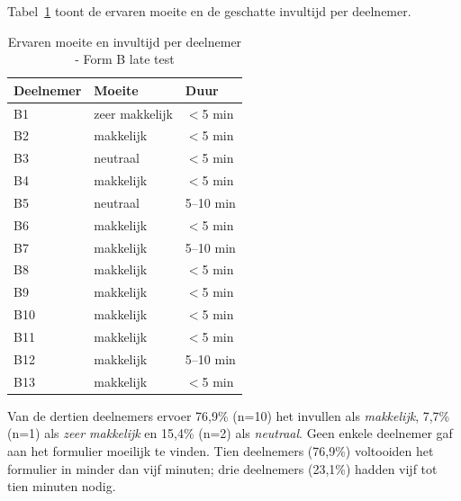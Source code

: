 \subsubsection{}

Tabel~\ref{tab:laat-formb-moeite} toont de ervaren moeite en de geschatte invultijd per deelnemer.

\begin{table}[h]
  \centering
  \caption[Ervaren moeite en invultijd late test Form B]{Ervaren moeite en invultijd per deelnemer - Form B late test}
  \label{tab:laat-formb-moeite}
  \begin{tabular}{lll}
    \hline
    \textbf{Deelnemer} & \textbf{Moeite} & \textbf{Duur} \\
    \hline
    B1  & zeer makkelijk & $<$5 min  \\
    B2  & makkelijk      & $<$5 min  \\
    B3  & neutraal       & $<$5 min  \\
    B4  & makkelijk      & $<$5 min  \\
    B5  & neutraal       & 5–10 min  \\
    B6  & makkelijk      & $<$5 min  \\
    B7  & makkelijk      & 5–10 min  \\
    B8  & makkelijk      & $<$5 min  \\
    B9  & makkelijk      & $<$5 min  \\
    B10 & makkelijk      & $<$5 min  \\
    B11 & makkelijk      & $<$5 min  \\
    B12 & makkelijk      & 5–10 min  \\
    B13 & makkelijk      & $<$5 min  \\
    \hline
  \end{tabular}
\end{table}

Van de dertien deelnemers ervoer 76,9\% (n=10) het invullen als \textit{makkelijk}, 7,7\% (n=1) als \textit{zeer makkelijk} en 15,4\% (n=2) als \textit{neutraal}. Geen enkele deelnemer gaf aan het formulier moeilijk te vinden. Tien deelnemers (76,9\%) voltooiden het formulier in minder dan vijf minuten; drie deelnemers (23,1\%) hadden vijf tot tien minuten nodig.

\subsubsection{}

